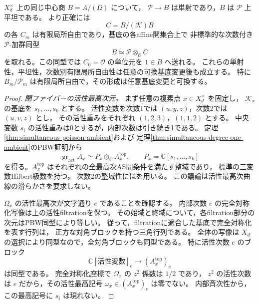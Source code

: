 \begin{proposition}\label{lem:simultaneous-central-flatness}
$X_d^\times$ 上の同じ中心商 $B=A/(\Omega)$ について，
$\mathcal P\to B$ は単射であり，$B$ は $\mathcal P$ 上平坦である。
より正確には
\[
 C=B/(\mathcal K)B
\]
の各 $C_m$ は有限局所自由であり，基底の各affine開集合上で
非標準的な次数付き $\mathcal P$-加群同型
\begin{equation}\label{eq:simultaneous-casimir-splitting}
 B\simeq\mathcal P\otimes_{\mathcal O}C
\end{equation}
を取れる。この同型では $C_0=\mathcal O$ の単位元を $1\in B$ へ送れる。
これらの単射性，平坦性，次数別有限局所自由性は任意の可換基底変更後も成立する。
特に $B_m/\mathcal P_m$ は有限局所自由で，その形成は任意基底変更と可換する。
\end{proposition}
\begin{proof}
\emph{閉ファイバーの活性最高次元。}
まず任意の複素点 $x\in X_d^\times$ を固定し，
$\mathcal K_x$ の基底を $s_1,\ldots,s_k$ とする。
活性変数を次数1では $(u,y,z)$，次数2では $(u,v,z)$ とし，
その活性重みをそれぞれ $(1,2,3)$，$(1,1,2)$ とする。
中央変数 $s_i$ の活性重みは0とするが，内部次数は引き続き1である。
定理\ref{thm:simultaneous-poisson-ambient}および
定理\ref{thm:simultaneous-degree-one-ambient}のPBW証明から
\[
 \operatorname{gr}_{\mathrm{act}}A_x
   \simeq P_x\otimes_{\mathbb C}A_x^{\mathrm{top}},
 \qquad P_x=\mathbb C[s_1,\ldots,s_k]
\]
を得る。$A_x^{\mathrm{top}}$ はそれぞれの全最高次AS開条件を満たす整域であり，
標準の三変数Hilbert級数を持つ。
次数2の整域性には\cite[Corollary~3.8]{MoriUeyama2019}を用いる。
この議論は活性最高次曲線の滑らかさを要求しない。

$\Omega_x$ の活性最高次が文字通り $e$ であることを確認する。
内部次数 $e$ の完全対称化写像は上の活性filtrationを保つ。
その始域と終域について，各filtration部分の次元はPBW同型により等しい。
従って，filtrationに適合した基底で完全対称化を表す行列は，
正方な対角ブロックを持つ三角行列である。
全体の写像は $X_d$ の選択により同型なので，全対角ブロックも同型である。
特に活性次数 $e$ のブロック
\[
 \mathbb C[\text{活性変数}]_e
      \longrightarrow (A_x^{\mathrm{top}})_e
\]
は同型である。
完全対称化座標で $\Omega_x$ の $z^2$ 係数は $1/2$ であり，
$z^2$ の活性次数は $e$ だから，その活性最高記号
$\omega_x\in(A_x^{\mathrm{top}})_e$ は零でない。
内部斉次性から，この最高記号に $s_i$ は現れない。


\end{proof}
